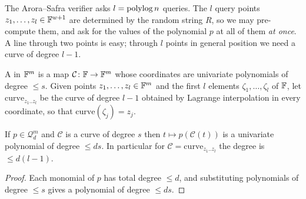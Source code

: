 The Arora--Safra verifier asks $l=\operatorname{polylog} n$ queries.  The $l$ query points $z_1,\dots,z_l\in\mathbb{F}^{w+1}$ are determined by the random string $R$, so we may pre-compute them, and ask for the values of the polynomial $p$ at all of them \emph{at once}.
A line through two points is easy; through $l$ points in general position we need a curve of degree $l-1$.

\begin{definition}[Curves]\label{def:curve}
A  in $\mathbb{F}^m$ is a map $\mathcal C\colon\mathbb{F}\to\mathbb{F}^m$ whose coordinates are univariate polynomials of degree $\le s$.  Given points $z_1,\dots,z_l\in\mathbb{F}^m$ and the first $l$ elements $\zeta_1,\dots,\zeta_l$ of $\mathbb{F}$, let $\mathrm{curve}_{z_1..z_l}$ be the curve of degree $l-1$ obtained by Lagrange interpolation in every coordinate, so that $\mathrm{curve}(\zeta_j)=z_j$.
\end{definition}

\begin{proposition}\label{prop:curve-deg}
If $p\in\mathcal Q^m_d$ and $\mathcal C$ is a curve of degree $s$ then $t\mapsto p(\mathcal C(t))$ is a univariate polynomial of degree $\le ds$.  In particular for $\mathcal C=\mathrm{curve}_{z_1..z_l}$ the degree is $\le d(l-1)$.
\end{proposition}
\begin{proof}
Each monomial of $p$ has total degree $\le d$, and substituting polynomials of degree $\le s$ gives a polynomial of degree $\le ds$.
\end{proof}

